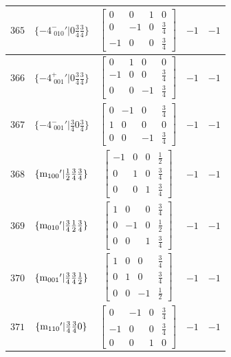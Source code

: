 \documentclass[fleqn,8pt]{jsarticle}
\begin{document}
\begin{longtable}{ccccc}
$ 365 $ & $ \{-4^{-}_{\,\,010}{}'|0 \frac{3}{4} \frac{3}{4}\} $ & $ \begin{bmatrix} 0 & 0 & 1 & 0 \\ 0 & -1 & 0 & \frac{3}{4} \\ -1 & 0 & 0 & \frac{3}{4} \end{bmatrix} $ & $ -1 $ & $ -1 $ \\ \hline
$ 366 $ & $ \{-4^{+}_{\,\,001}{}'|0 \frac{3}{4} \frac{3}{4}\} $ & $ \begin{bmatrix} 0 & 1 & 0 & 0 \\ -1 & 0 & 0 & \frac{3}{4} \\ 0 & 0 & -1 & \frac{3}{4} \end{bmatrix} $ & $ -1 $ & $ -1 $ \\ \hline
$ 367 $ & $ \{-4^{-}_{\,\,001}{}'|\frac{3}{4} 0 \frac{3}{4}\} $ & $ \begin{bmatrix} 0 & -1 & 0 & \frac{3}{4} \\ 1 & 0 & 0 & 0 \\ 0 & 0 & -1 & \frac{3}{4} \end{bmatrix} $ & $ -1 $ & $ -1 $ \\ \hline
$ 368 $ & $ \{{\rm m}_{100}{}'|\frac{1}{2} \frac{3}{4} \frac{3}{4}\} $ & $ \begin{bmatrix} -1 & 0 & 0 & \frac{1}{2} \\ 0 & 1 & 0 & \frac{3}{4} \\ 0 & 0 & 1 & \frac{3}{4} \end{bmatrix} $ & $ -1 $ & $ -1 $ \\ \hline
$ 369 $ & $ \{{\rm m}_{010}{}'|\frac{3}{4} \frac{1}{2} \frac{3}{4}\} $ & $ \begin{bmatrix} 1 & 0 & 0 & \frac{3}{4} \\ 0 & -1 & 0 & \frac{1}{2} \\ 0 & 0 & 1 & \frac{3}{4} \end{bmatrix} $ & $ -1 $ & $ -1 $ \\ \hline
$ 370 $ & $ \{{\rm m}_{001}{}'|\frac{3}{4} \frac{3}{4} \frac{1}{2}\} $ & $ \begin{bmatrix} 1 & 0 & 0 & \frac{3}{4} \\ 0 & 1 & 0 & \frac{3}{4} \\ 0 & 0 & -1 & \frac{1}{2} \end{bmatrix} $ & $ -1 $ & $ -1 $ \\ \hline
$ 371 $ & $ \{{\rm m}_{110}{}'|\frac{3}{4} \frac{3}{4} 0\} $ & $ \begin{bmatrix} 0 & -1 & 0 & \frac{3}{4} \\ -1 & 0 & 0 & \frac{3}{4} \\ 0 & 0 & 1 & 0 \end{bmatrix} $ & $ -1 $ & $ -1 $ \\ \hline

\end{longtable}
\end{document}
